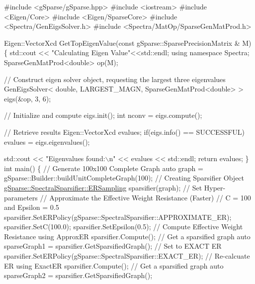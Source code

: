\begin{DoxyCode}
\textcolor{preprocessor}{#include <gSparse/gSparse.hpp>}
\textcolor{preprocessor}{#include <iostream>}
\textcolor{preprocessor}{#include <Eigen/Core>}
\textcolor{preprocessor}{#include <Eigen/SparseCore>}
\textcolor{preprocessor}{#include <Spectra/GenEigsSolver.h>}
\textcolor{preprocessor}{#include <Spectra/MatOp/SparseGenMatProd.h>}

Eigen::VectorXcd GetTopEigenValue(\textcolor{keyword}{const} gSparse::SparsePrecisionMatrix & M)
\{
    std::cout << \textcolor{stringliteral}{"Calculating Eigen Value"}<<std::endl;
    \textcolor{keyword}{using namespace }Spectra;
    SparseGenMatProd<double> op(M);

    \textcolor{comment}{// Construct eigen solver object, requesting the largest three eigenvalues}
    GenEigsSolver< double, LARGEST\_MAGN, SparseGenMatProd<double> > eigs(&op, 3, 6);

    \textcolor{comment}{// Initialize and compute}
    eigs.init();
    \textcolor{keywordtype}{int} nconv = eigs.compute();

    \textcolor{comment}{// Retrieve results}
    Eigen::VectorXcd evalues;
    \textcolor{keywordflow}{if}(eigs.info() == SUCCESSFUL)
        evalues = eigs.eigenvalues();

    std::cout << \textcolor{stringliteral}{"Eigenvalues found:\(\backslash\)n"} << evalues << std::endl;
    \textcolor{keywordflow}{return} evalues;
\}
\textcolor{keywordtype}{int} main()
\{
    \textcolor{comment}{// Generate 100x100 Complete Graph}
    \textcolor{keyword}{auto} graph = gSparse::Builder::buildUnitCompleteGraph(100);
    \textcolor{comment}{// Creating Sparsifier Object}
    \mbox{\hyperlink{classg_sparse_1_1_spectral_sparsifier_1_1_e_r_sampling}{gSparse::SpectralSparsifier::ERSampling}} sparsifier(graph);
    \textcolor{comment}{// Set Hyper-parameters}
    \textcolor{comment}{// Approximate the Effective Weight Resistance (Faster)}
    \textcolor{comment}{// C = 100 and Epsilon = 0.5}
    sparsifier.SetERPolicy(gSparse::SpectralSparsifier::APPROXIMATE\_ER);
    sparsifier.SetC(100.0);
    sparsifier.SetEpsilon(0.5);
    \textcolor{comment}{// Compute Effective Weight Resistance using ApproxER}
    sparsifier.Compute();
    \textcolor{comment}{// Get a sparsified graph}
    \textcolor{keyword}{auto} sparseGraph1 = sparsifier.GetSparsifiedGraph();
    \textcolor{comment}{// Set to EXACT ER}
    sparsifier.SetERPolicy(gSparse::SpectralSparsifier::EXACT\_ER);
    \textcolor{comment}{// Re-calcuate ER using ExactER}
    sparsifier.Compute();
    \textcolor{comment}{// Get a sparsified graph}
    \textcolor{keyword}{auto} sparseGraph2 = sparsifier.GetSparsifiedGraph();


\end{DoxyCode}
